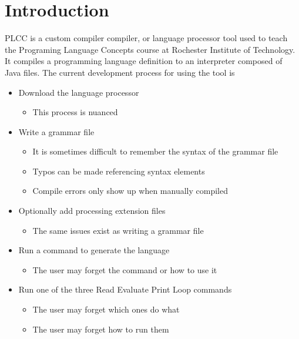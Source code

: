 \documentclass[conference, letterpaper]{IEEEtran}
\begin{document}
\section{Introduction}\label{sec:introduction}
PLCC\cite{plcc-paper} is a custom compiler compiler, or language processor tool used to teach the Programing Language Concepts course at Rochester Institute of Technology.
It compiles a programming language definition to an interpreter composed of Java files.
The current development process for using the tool is
\begin{itemize}
    \item Download the language processor
    \begin{itemize}
        \item This process is nuanced
    \end{itemize}

    \item Write a grammar file
    \begin{itemize}
        \item It is sometimes difficult to remember the syntax of the grammar file
        \item Typos can be made referencing syntax elements
        \item Compile errors only show up when manually compiled
    \end{itemize}

    \item Optionally add processing extension files
    \begin{itemize}
        \item The same issues exist as writing a grammar file
    \end{itemize}

    \item Run a command to generate the language
    \begin{itemize}
        \item The user may forget the command or how to use it
    \end{itemize}

    \item Run one of the three Read Evaluate Print Loop commands
    \begin{itemize}
        \item The user may forget which ones do what
        \item The user may forget how to run them
    \end{itemize}
\end{itemize}
\end{document}

